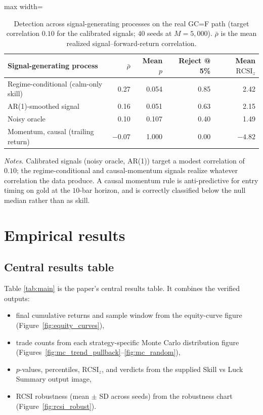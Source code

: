 \documentclass[preprint,12pt]{elsarticle}
\theoremstyle{definition}
\begin{document}
\begin{table}[H]
\centering
\caption{Detection across signal-generating processes on the real GC=F path (target correlation $0.10$ for the calibrated signals; $40$ seeds at $M=5{,}000$). $\bar\rho$ is the mean realized signal--forward-return correlation.}
\label{tab:signal_mechanisms}
{\small
\renewcommand{\arraystretch}{1.12}
\begin{adjustbox}{max width=\textwidth}
\begin{tabular}{@{}lrrrr@{}}
\toprule
Signal-generating process & $\bar\rho$ & Mean $p$ & Reject @ 5\% & Mean $\mathrm{RCSI}_z$ \\
\midrule
Regime-conditional (calm-only skill) & \phantom{-}0.27 & 0.054 & 0.85 & \phantom{-}2.42 \\
AR(1)-smoothed signal & \phantom{-}0.16 & 0.051 & 0.63 & \phantom{-}2.15 \\
Noisy oracle & \phantom{-}0.10 & 0.107 & 0.40 & \phantom{-}1.49 \\
Momentum, causal (trailing return) & $-0.07$ & 1.000 & 0.00 & $-4.82$ \\
\bottomrule
\end{tabular}
\end{adjustbox}
}
\par\vspace{0.5em}
\begin{minipage}{0.95\textwidth}
\centering
\footnotesize\emph{Notes.} Calibrated signals (noisy oracle, AR(1)) target a modest correlation of $0.10$; the regime-conditional and causal-momentum signals realize whatever correlation the data produce. A causal momentum rule is anti-predictive for entry timing on gold at the $10$-bar horizon, and is correctly classified below the null median rather than as skill.
\end{minipage}
\end{table}

\section{Empirical results}

\subsection{Central results table}

Table \ref{tab:main} is the paper's central results table. It combines the verified outputs:
\begin{itemize}
\item final cumulative returns and sample window from the equity-curve figure (Figure~\ref{fig:equity_curves}),
\item trade counts from each strategy-specific Monte Carlo distribution figure (Figures~\ref{fig:mc_trend_pullback}--\ref{fig:mc_random}),
\item $p$-values, percentiles, $\mathrm{RCSI}_z$, and verdicts from the supplied Skill vs Luck Summary output image,
\item RCSI robustness (mean $\pm$ SD across seeds) from the robustness chart (Figure~\ref{fig:rcsi_robust}).
\end{itemize}
\end{document}
